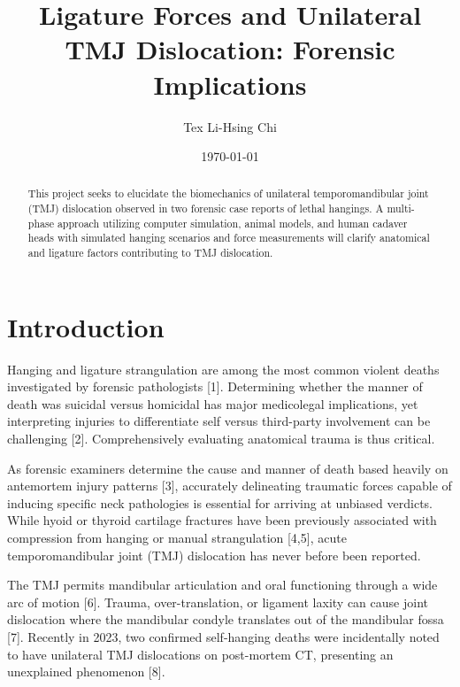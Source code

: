 \documentclass{article}
\title{Ligature Forces and Unilateral TMJ Dislocation: Forensic Implications}
\author{Tex Li-Hsing Chi \\ \tmu}
\date{\today}
\begin{document}
\maketitle 

\begin{abstract}
This project seeks to elucidate the biomechanics of unilateral temporomandibular joint (TMJ) dislocation observed in two forensic case reports of lethal hangings. A multi-phase approach utilizing computer simulation, animal models, and human cadaver heads with simulated hanging scenarios and force measurements will clarify anatomical and ligature factors contributing to TMJ dislocation.  
\end{abstract}


\section{Introduction}

Hanging and ligature strangulation are among the most common violent deaths investigated by forensic pathologists [1]. Determining whether the manner of death was suicidal versus homicidal has major medicolegal implications, yet interpreting injuries to differentiate self versus third-party involvement can be challenging [2]. Comprehensively evaluating anatomical trauma is thus critical.  

As forensic examiners determine the cause and manner of death based heavily on antemortem injury patterns [3], accurately delineating traumatic forces capable of inducing specific neck pathologies is essential for arriving at unbiased verdicts. While hyoid or thyroid cartilage fractures have been previously associated with compression from hanging or manual strangulation [4,5], acute temporomandibular joint (TMJ) dislocation has never before been reported.

The TMJ permits mandibular articulation and oral functioning through a wide arc of motion [6]. Trauma, over-translation, or ligament laxity can cause joint dislocation where the mandibular condyle translates out of the mandibular fossa [7]. Recently in 2023, two confirmed self-hanging deaths were incidentally noted to have unilateral TMJ dislocations on post-mortem CT, presenting an unexplained phenomenon [8]. %
\end{document}
